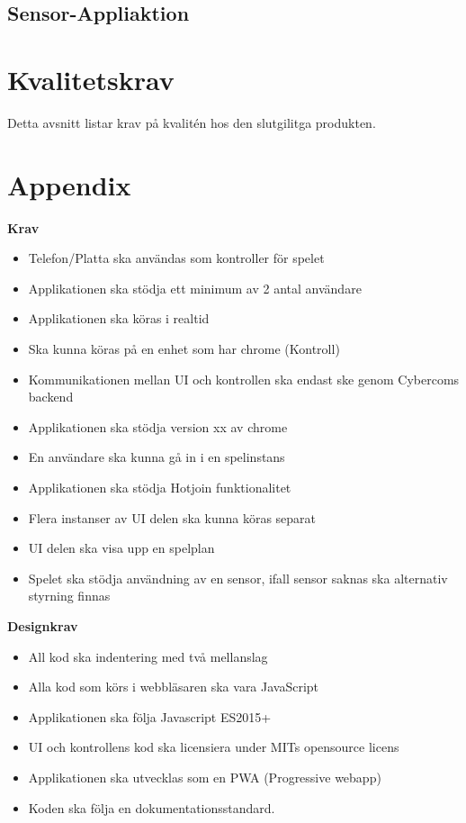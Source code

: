 \documentclass[10pt]{article}
\begin{document}
	\subsection{Sensor-Appliaktion}
	

\section{Kvalitetskrav}
	Detta avsnitt listar krav på kvalitén hos den slutgilitga produkten.
\pagebreak
\section{Appendix}
	\hfill
	\bigskip
	\begin{center}\textbf{Krav}\end{center}
	\begin{itemize}
		\item Telefon/Platta ska användas som kontroller för spelet
		\item Applikationen ska stödja ett minimum av 2 antal användare
		\item Applikationen ska köras i realtid
		\item Ska kunna köras på en enhet som har chrome (Kontroll)
		\item Kommunikationen mellan UI och kontrollen ska endast ske genom Cybercoms backend
		\item Applikationen ska stödja version xx av chrome
		\item En användare ska kunna gå in i en spelinstans
		\item Applikationen ska stödja Hotjoin funktionalitet
		\item Flera instanser av UI delen ska kunna köras separat
		\item UI delen ska visa upp en spelplan
		\item Spelet ska stödja användning av en sensor, ifall sensor saknas ska alternativ styrning finnas
	\end{itemize}
	\bigskip
	\begin{center}\textbf{Designkrav}\end{center}
	\begin{itemize}
		\item All kod ska indentering med två mellanslag
		\item Alla kod som körs i webbläsaren ska vara JavaScript
		\item Applikationen ska följa Javascript ES2015+
		\item UI och kontrollens kod ska licensiera under MITs opensource licens
		\item Applikationen ska utvecklas som en PWA (Progressive webapp)
		\item Koden ska följa en dokumentationsstandard. 
		
	\end{itemize}
\end{document}
